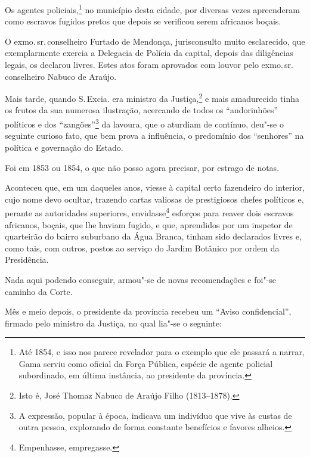 Os agentes policiais,\footnote{Até 1854, e isso nos parece revelador
  para o exemplo que ele passará a narrar, Gama serviu como oficial da
  Força Pública, espécie de agente policial subordinado, em última
  instância, ao presidente da província.} no município desta cidade,
por diversas vezes apreenderam como escravos fugidos pretos que depois
se verificou serem africanos boçais.

O exmo.\,sr.\,conselheiro Furtado de Mendonça, jurisconsulto muito
esclarecido, que exemplarmente exercia a Delegacia de Polícia da
capital, depois das diligências legais, os declarou livres. Estes atos
foram aprovados com louvor pelo exmo.\,sr.\,conselheiro Nabuco de Araújo.

Mais tarde, quando S.\,Excia. era ministro da Justiça,\footnote{Isto é,
  José Thomaz Nabuco de Araújo Filho (1813--1878).} e mais amadurecido
tinha os frutos da sua numerosa ilustração, acercando de todos os
``andorinhões'' políticos e dos ``zangões''\footnote{A expressão, popular
  à época, indicava um indivíduo que vive às custas de outra pessoa,
  explorando de forma constante benefícios e favores alheios.} da
lavoura, que o aturdiam de contínuo, deu"-se o seguinte curioso fato, que
bem prova a influência, o predomínio dos ``senhores'' na política e
governação do Estado.

Foi em 1853 ou 1854, o que não posso agora precisar, por estrago de
notas.

Aconteceu que, em um daqueles anos, viesse à capital certo fazendeiro do
interior, cujo nome devo ocultar, trazendo cartas valiosas de
prestigiosos chefes políticos e, perante as autoridades superiores,
envidasse\footnote{Empenhasse, empregasse.} esforços para reaver dois
escravos africanos, boçais, que lhe haviam fugido, e que, aprendidos por
um inspetor de quarteirão do bairro suburbano da Água Branca, tinham
sido declarados livres e, como tais, com outros, postos ao serviço do
Jardim Botânico por ordem da Presidência.

Nada aqui podendo conseguir, armou"-se de novas recomendações e foi"-se
caminho da Corte.

Mês e meio depois, o presidente da província recebeu um ``Aviso
confidencial'', firmado pelo ministro da Justiça, no qual lia"-se o
seguinte:

